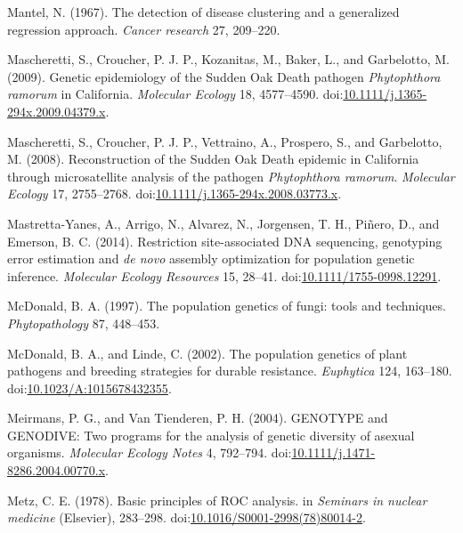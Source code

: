 \documentclass[double,12pt]{beavtex}
\begin{document}
  \hypertarget{ref-mantel1967detection}{}
  Mantel, N. (1967). The detection of disease clustering and a generalized
  regression approach. \emph{Cancer research} 27, 209--220.
  
  \hypertarget{ref-mascheretti2009genetic}{}
  Mascheretti, S., Croucher, P. J. P., Kozanitas, M., Baker, L., and
  Garbelotto, M. (2009). Genetic epidemiology of the Sudden Oak Death
  pathogen \emph{Phytophthora ramorum} in California. \emph{Molecular
  Ecology} 18, 4577--4590.
  doi:\href{https://doi.org/10.1111/j.1365-294x.2009.04379.x}{10.1111/j.1365-294x.2009.04379.x}.
  
  \hypertarget{ref-mascheretti2008reconstruction}{}
  Mascheretti, S., Croucher, P. J. P., Vettraino, A., Prospero, S., and
  Garbelotto, M. (2008). Reconstruction of the Sudden Oak Death epidemic
  in California through microsatellite analysis of the pathogen
  \emph{Phytophthora ramorum}. \emph{Molecular Ecology} 17, 2755--2768.
  doi:\href{https://doi.org/10.1111/j.1365-294x.2008.03773.x}{10.1111/j.1365-294x.2008.03773.x}.
  
  \hypertarget{ref-mastretta2015restriction}{}
  Mastretta-Yanes, A., Arrigo, N., Alvarez, N., Jorgensen, T. H., Piñero,
  D., and Emerson, B. C. (2014). Restriction site-associated DNA
  sequencing, genotyping error estimation and \emph{de novo} assembly
  optimization for population genetic inference. \emph{Molecular Ecology
  Resources} 15, 28--41.
  doi:\href{https://doi.org/10.1111/1755-0998.12291}{10.1111/1755-0998.12291}.
  
  \hypertarget{ref-mcdonald1997population}{}
  McDonald, B. A. (1997). The population genetics of fungi: tools and
  techniques. \emph{Phytopathology} 87, 448--453.
  
  \hypertarget{ref-Mcdonald2002}{}
  McDonald, B. A., and Linde, C. (2002). The population genetics of plant
  pathogens and breeding strategies for durable resistance.
  \emph{Euphytica} 124, 163--180.
  doi:\href{https://doi.org/10.1023/A:1015678432355}{10.1023/A:1015678432355}.
  
  \hypertarget{ref-meirmans2004genotype}{}
  Meirmans, P. G., and Van Tienderen, P. H. (2004). GENOTYPE and GENODIVE:
  Two programs for the analysis of genetic diversity of asexual organisms.
  \emph{Molecular Ecology Notes} 4, 792--794.
  doi:\href{https://doi.org/10.1111/j.1471-8286.2004.00770.x}{10.1111/j.1471-8286.2004.00770.x}.
  
  \hypertarget{ref-metz1978basic}{}
  Metz, C. E. (1978). Basic principles of ROC analysis. in \emph{Seminars
  in nuclear medicine} (Elsevier), 283--298.
  doi:\href{https://doi.org/10.1016/S0001-2998(78)80014-2}{10.1016/S0001-2998(78)80014-2}.
  
\end{document}
